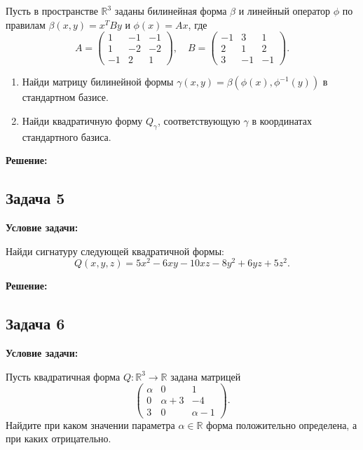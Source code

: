\documentclass[a4paper,12pt]{article}
\begin{document}
Пусть в пространстве $\mathbb{R}^3$ заданы билинейная форма $\beta$ и линейный оператор $\phi$ по правилам $\beta(x, y) = x^T By$ и $\phi(x) = Ax$, где
$$
A =
\begin{pmatrix}
1 & -1 & -1 \\
1 & -2 & -2 \\
-1 & 2 & 1
\end{pmatrix}, \quad
B =
\begin{pmatrix}
-1 & 3 & 1 \\
2 & 1 & 2 \\
3 & -1 & -1
\end{pmatrix}.
$$
\begin{enumerate}
    \item Найди матрицу билинейной формы $\gamma(x, y) = \beta(\phi(x), \phi^{-1}(y))$ в стандартном базисе.
    \item Найди квадратичную форму $Q_\gamma$, соответствующую $\gamma$ в координатах стандартного базиса.
\end{enumerate}

\textbf{Решение:}


\vspace{1cm}

\subsection{Задача 5}
\textbf{Условие задачи:}

Найди сигнатуру следующей квадратичной формы:
$$
Q(x, y, z) = 5x^2 - 6xy - 10xz - 8y^2 + 6yz + 5z^2.
$$

\textbf{Решение:}


\vspace{1cm}

\subsection{Задача 6}
\textbf{Условие задачи:}

Пусть квадратичная форма $Q: \mathbb{R}^3 \to \mathbb{R}$ задана матрицей
$$
\begin{pmatrix}
\alpha & 0 & 1 \\
0 & \alpha + 3 & -4 \\
3 & 0 & \alpha - 1
\end{pmatrix}.
$$
Найдите при каком значении параметра $\alpha \in \mathbb{R}$ форма положительно определена, а при каких отрицательно.
\end{document}
